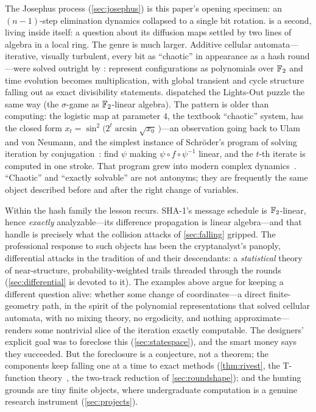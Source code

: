 The Josephus process (\cref{sec:josephus}) is this paper's opening
specimen: an $(n-1)$-step elimination dynamics collapsed to a single
bit rotation.  is a second, living inside \SHA{}
itself: a question about its diffusion maps settled by two lines of
algebra in a local ring. The genre is much larger. Additive cellular
automata---iterative, visually turbulent, every bit as ``chaotic'' in
appearance as a hash round---were solved outright by
\citet{MartinOdlyzkoWolfram1984}: represent configurations as
polynomials over $\mathbb{F}_2$ and time evolution becomes multiplication,
with global transient and cycle structure falling out as exact
divisibility statements. \citet{Sutner1989} dispatched the Lights-Out
puzzle the same way (the $\sigma$-game as $\mathbb{F}_2$-linear algebra). The
pattern is older than computing: the logistic map at parameter $4$, the
textbook ``chaotic'' system, has the closed form
$x_t = \sin^2\!\bigl(2^t \arcsin\sqrt{x_0}\,\bigr)$---an observation
going back to Ulam and von Neumann, and the simplest instance of
Schr{\"o}der's program of solving iteration by
conjugation~\citep{Schroeder1871}: find $\psi$ making
$\psi \circ f \circ \psi^{-1}$ linear, and the $t$-th iterate is
computed in one stroke. That program grew into modern complex
dynamics~\citep{Milnor2006}. ``Chaotic'' and ``exactly solvable'' are
not antonyms; they are frequently the same object described before and
after the right change of variables.

Within the hash family the lesson recurs. SHA-1's message schedule is
$\mathbb{F}_2$-linear, hence \emph{exactly} analyzable---its difference
propagation is linear algebra---and that handle is precisely what the
collision attacks of \cref{sec:falling} gripped. The professional
response to such objects has been the cryptanalyst's panoply,
differential attacks in the tradition of \citet{BihamShamir1991} and
their descendants: a \emph{statistical} theory of near-structure,
probability-weighted trails threaded through the rounds
(\cref{sec:differential} is devoted to it). The examples
above argue for keeping a different question alive: whether some change
of coordinates---a direct finite-geometry path, in the spirit of the
polynomial representations that solved cellular automata, with no
mixing theory, no ergodicity, and nothing approximate---renders some
nontrivial slice of the iteration exactly computable. The designers'
explicit goal was to foreclose this (\cref{sec:statespace}), and the
smart money says they succeeded. But the foreclosure is a conjecture,
not a theorem; the components keep falling one at a time to exact
methods (\cref{thm:rivest}, the T-function
theory~\citep{KlimovShamir2003, Anashin2006}, the two-track reduction
of \cref{sec:roundshape}); and the hunting grounds are tiny finite
objects, where undergraduate computation is a genuine research
instrument (\cref{sec:projects}).
